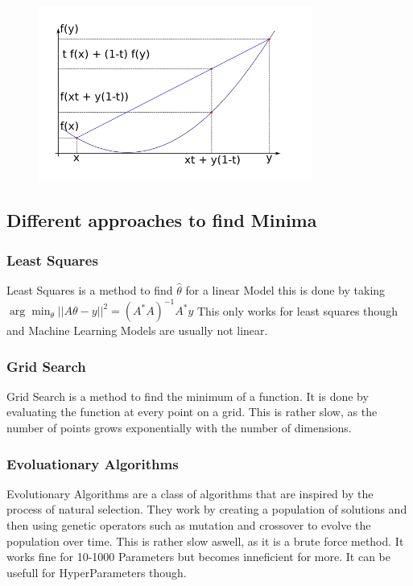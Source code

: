 \documentclass[a4paper]{article}
\begin{document}
\begin{figure}[h]
    \centering
    \includegraphics[width=0.8\textwidth]{images/convex.png}
    \caption{}
    \label{fig: Illustration of Convexity}
\end{figure}

\subsection{Different approaches to find Minima}

\subsubsection{Least Squares}
Least Squares is a method to find $\hat{\theta}$ for a linear Model this is done by taking $\arg \min_{\theta} ||A \theta - y ||^{2} = (A^{*}A)^{-1} A^{*}y$ This only works for least squares though and Machine Learning Models are usually not linear.

\subsubsection{Grid Search}
Grid Search is a method to find the minimum of a function. It is done by evaluating the function at every point on a grid. This is rather slow, as the number of points grows exponentially with the number of dimensions.

\subsubsection{Evoluationary Algorithms}
Evolutionary Algorithms are a class of algorithms that are inspired by the process of natural selection. They work by creating a population of solutions and then using genetic operators such as mutation and crossover to evolve the population over time. This is rather slow aswell, as it is a brute force method. It works fine for 10-1000 Parameters but becomes inneficient for more. It can be usefull for HyperParameters though. 
\end{document}
